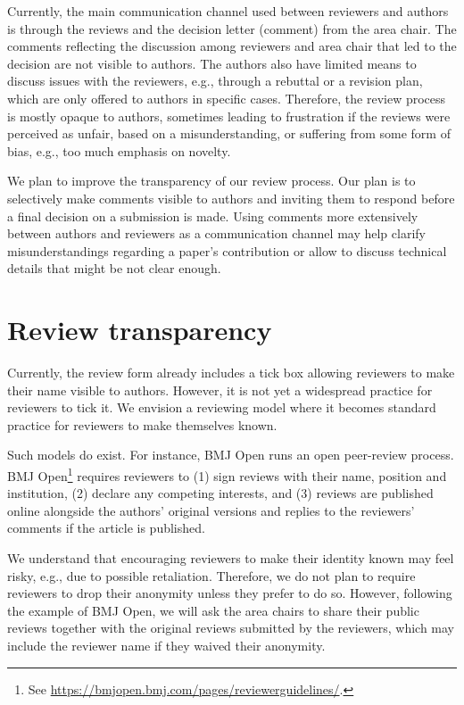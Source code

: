 \documentclass[sigconf]{acmart}
\begin{document}
Currently, the main communication channel used between reviewers and authors is through the reviews and the decision letter (comment) from the area chair. The comments reflecting the discussion among reviewers and area chair that led to the decision are not visible to authors. The authors also have limited means to discuss issues with the reviewers, e.g., through a rebuttal or a revision plan, which are only offered to authors in specific cases. Therefore, the review process is mostly opaque to authors, sometimes leading to frustration if the reviews were perceived as unfair, based on a misunderstanding, or suffering from some form of bias, e.g., too much emphasis on novelty. 

We plan to improve the transparency of our review process.  Our plan is to selectively make comments visible to authors and inviting them to respond before a final decision on a submission is made.  Using comments more extensively between authors and reviewers as a communication channel may help clarify misunderstandings regarding a paper's contribution or allow to discuss technical details that might be not clear enough. 

\section{Review transparency}
\label{sec:anonymity}

Currently, the review form already includes a tick box allowing reviewers to make their name visible to authors. However, it is not yet a widespread practice for reviewers to tick it. We envision a reviewing model where it becomes standard practice for reviewers to make themselves known.

Such models do exist. For instance, BMJ Open runs an open peer-review process. BMJ Open\footnote{See \url{https://bmjopen.bmj.com/pages/reviewerguidelines/}.} requires reviewers to (1) sign reviews with their name, position and institution, (2) declare any competing interests, and (3) reviews are published online alongside the authors' original versions and replies to the reviewers' comments if the article is published.

We understand that encouraging reviewers to make their identity known may feel risky, e.g., due to possible retaliation. Therefore, we do not plan to require reviewers to drop their anonymity unless they prefer to do so. However, following the example of BMJ Open,  we will ask the area chairs to share their public reviews together with the original reviews submitted by the reviewers, which may include the reviewer name if they waived their anonymity.
\end{document}
